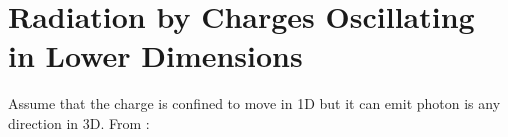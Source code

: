 \chapter{Radiation by Charges Oscillating in Lower Dimensions}
\label{AppendixC}

Assume that the charge is confined to move in 1D but it can emit photon is any direction in 3D. From \cite{Jackson}:



